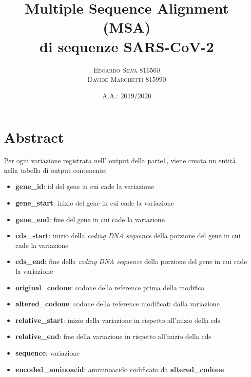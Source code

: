 \documentclass[11pt,italian]{article}
\title{Multiple Sequence Alignment (MSA) \\ di sequenze SARS-CoV-2}
\date{A.A.: 2019/2020}
\author{
    \textsc{Edoardo Silva} 816560 \\
    \textsc{Davide Marchetti} 815990
}
\begin{document}
\maketitle

\section{Abstract}
Per ogni variazione registrata nell' output della parte1, viene creata un entità nella tabella di output contenente:

\begin{itemize}
    \item \textbf{gene\_id}: id del gene in cui cade la variazione
    \item \textbf{gene\_start}: inizio del gene in cui cade la variazione
    \item \textbf{gene\_end}: fine del gene in cui cade la variazione
    \item \textbf{cds\_start}: inizio della \textit{coding DNA sequence} della porzione del gene in cui cade la variazione
    \item \textbf{cds\_end}: fine della \textit{coding DNA sequence} della porzione del gene in cui cade la variazione
    \item \textbf{original\_codone}: codone della reference prima della modifica
    \item \textbf{altered\_codone}: codone della reference modificati dalla variazione
    \item \textbf{relative\_start}: inizio della variazione in rispetto all'inizio della cds
    \item \textbf{relative\_end}: fine della variazione in rispetto all'inizio della cds
    \item \textbf{sequence}: variazione
    \item \textbf{encoded\_aminoacid}: amminoacido codificato da \textbf{altered\_codone}
\end{itemize}
\end{document}
